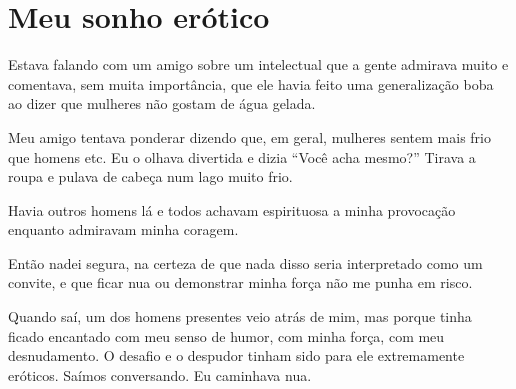 \chapter{Meu sonho erótico}\label{meu-sonho-eruxf3tico}

Estava falando com um amigo sobre um intelectual que a gente admirava
muito e comentava, sem muita importância, que ele havia feito uma
generalização boba ao dizer que mulheres não gostam de água gelada.

Meu amigo tentava ponderar dizendo que, em geral, mulheres sentem mais
frio que homens etc. Eu o olhava divertida e dizia ``Você acha mesmo?''
Tirava a roupa e pulava de cabeça num lago muito frio.

Havia outros homens lá e todos achavam espirituosa a minha provocação
enquanto admiravam minha coragem.

Então nadei segura, na certeza de que nada disso seria interpretado como
um convite, e que ficar nua ou demonstrar minha força não me punha em
risco.

Quando saí, um dos homens presentes veio atrás de mim, mas porque tinha
ficado encantado com meu senso de humor, com minha força, com meu
desnudamento. O desafio e o despudor tinham sido para ele extremamente
eróticos. Saímos conversando. Eu caminhava nua.
